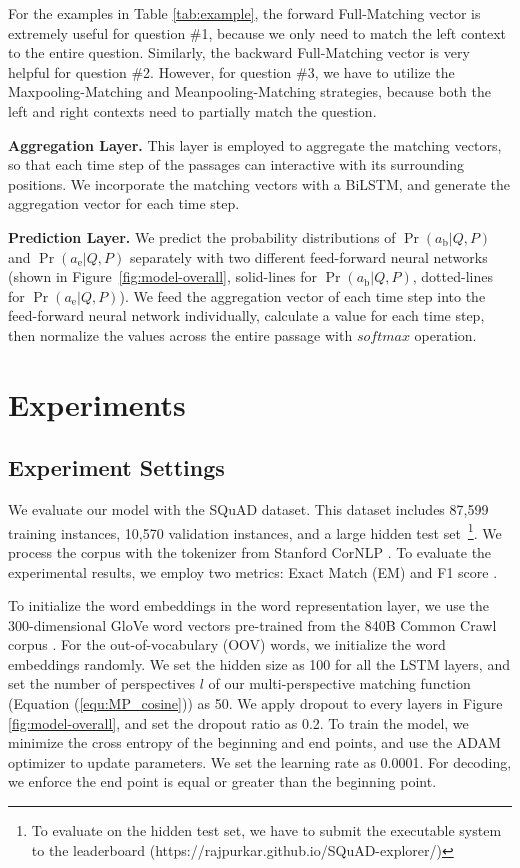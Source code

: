 \documentclass[11pt,letterpaper]{article}
\begin{document}
For the examples in Table \ref{tab:example}, the forward Full-Matching vector is extremely useful for question \#1, because we only need to match the left context to the entire question. Similarly, the backward Full-Matching vector is very helpful for question \#2. However, for question \#3, we have to utilize the Maxpooling-Matching and Meanpooling-Matching strategies, because both the left and right contexts need to partially match the question.

\textbf{Aggregation Layer.} 
This layer is employed to aggregate the matching vectors, so that each time step of the passages can interactive with its surrounding positions. We incorporate the matching vectors with a BiLSTM, and generate the aggregation vector for each time step.

\textbf{Prediction Layer.} 
We predict the probability distributions of $\Pr(a_\text{b}|Q, P)$ and $\Pr(a_\text{e}|Q, P)$ separately 
with two different feed-forward neural networks (shown in Figure~\ref{fig:model-overall}, solid-lines for $\Pr(a_\text{b}|Q, P)$,
dotted-lines for $\Pr(a_\text{e}|Q, P)$).
We feed the aggregation vector of each time step into the feed-forward neural network individually, calculate a value for each time step, 
then normalize the values across the entire passage with $softmax$ operation. 



\section{Experiments}
\label{sec:experiments}

\subsection{Experiment Settings}
We evaluate our model with the SQuAD dataset. This dataset includes 87,599 training instances, 10,570 validation instances, and a large hidden test set~\footnote{To evaluate on the hidden test set, we have to submit the executable system to the leaderboard (https://rajpurkar.github.io/SQuAD-explorer/)}. We process the corpus with the tokenizer from Stanford CorNLP \cite{manning-EtAl:2014:P14-5}. To evaluate the experimental results, we employ two metrics: Exact Match (EM) and F1 score \cite{rajpurkar2016squad}.

To initialize the word embeddings in the word representation layer, we use the 300-dimensional GloVe word vectors pre-trained from the 840B Common Crawl corpus \cite{pennington2014glove}. For the out-of-vocabulary (OOV) words, we initialize the word embeddings randomly. We set the hidden size as 100 for all the LSTM layers, and set the number of perspectives $l$ of our multi-perspective matching function (Equation (\ref{equ:MP_cosine})) as 50. We apply dropout to every layers in Figure \ref{fig:model-overall}, and set the dropout ratio as 0.2. To train the model, we minimize the cross entropy of the beginning and end points, and use the ADAM optimizer \cite{kingma2014adam} to update parameters. We set the learning rate as 0.0001. For decoding, we enforce the end point is equal or greater than the beginning point.
\end{document}
